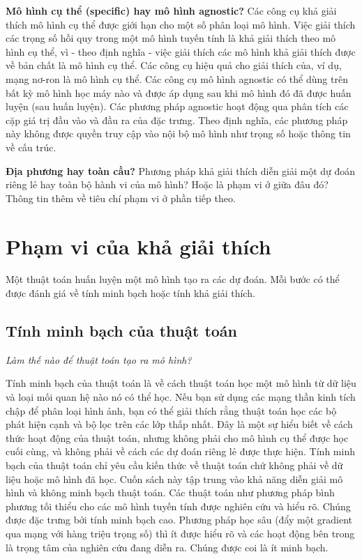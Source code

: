 \textbf{Mô hình cụ thể (specific) hay mô hình agnostic?} Các công cụ khả giải thích mô hình cụ thể được giới hạn cho một số phân loại mô hình. Việc giải thích các trọng số hồi quy trong một mô hình tuyến tính là khả giải thích theo mô hình cụ thể, vì - theo định nghĩa - việc giải thích các mô hình khả giải thích được về bản chất là mô hình cụ thể. Các công cụ hiệu quả cho giải thích của, ví dụ, mạng nơ-ron là mô hình cụ thể. Các công cụ mô hình agnostic có thể dùng trên bất kỳ mô hình học máy nào và được áp dụng sau khi mô hình đó đã được huấn luyện (sau huấn luyện). Các phương pháp agnostic hoạt động qua phân tích các cặp giá trị đầu vào và đầu ra của đặc trưng. Theo định nghĩa, các phương pháp này không được quyền truy cập vào nội bộ mô hình như trọng số hoặc thông tin về cấu trúc.

\textbf{Địa phương hay toàn cầu?} Phương pháp khả giải thích diễn giải một dự đoán riêng lẻ hay toàn bộ hành vi của mô hình? Hoặc là phạm vi ở giữa đâu đó? Thông tin thêm về tiêu chí phạm vi ở phần tiếp theo.


\clearpage 


\section{Phạm vi của khả giải thích}
Một thuật toán huấn luyện một mô hình tạo ra các dự đoán. Mỗi bước có thể được đánh giá về tính minh bạch hoặc tính khả giải thích.
\subsection{Tính minh bạch của thuật toán}
\textit{Làm thế nào để thuật toán tạo ra mô hình?}

Tính minh bạch của thuật toán là về cách thuật toán học một mô hình từ dữ liệu và loại mối quan hệ nào nó có thể học. Nếu bạn sử dụng các mạng thần kinh tích chập để phân loại hình ảnh, bạn có thể giải thích rằng thuật toán học các bộ phát hiện cạnh và bộ lọc trên các lớp thấp nhất. Đây là một sự hiểu biết về cách thức hoạt động của thuật toán, nhưng không phải cho mô hình cụ thể được học cuối cùng, và không phải về cách các dự đoán riêng lẻ được thực hiện. Tính minh bạch của thuật toán chỉ yêu cầu kiến thức về thuật toán chứ không phải về dữ liệu hoặc mô hình đã học. Cuốn sách này tập trung vào khả năng diễn giải mô hình và không minh bạch thuật toán. Các thuật toán như phương pháp bình phương tối thiểu cho các mô hình tuyến tính được nghiên cứu và hiểu rõ. Chúng được đặc trưng bởi tính minh bạch cao. Phương pháp học sâu (đẩy một gradient qua mạng với hàng triệu trọng số) thì ít được hiểu rõ và các hoạt động bên trong là trọng tâm của nghiên cứu đang diễn ra. Chúng được coi là ít minh bạch.
